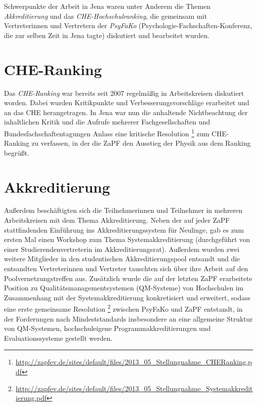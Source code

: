 \documentclass{scrartcl}
\renewcommand{\headrulewidth}{0pt}
\begin{document}
Schwerpunkte der Arbeit in Jena waren unter Anderem die Themen \emph{Akkreditierung} und das \emph{CHE-Hochschulranking}, die gemeinsam mit Vertreterinnen und Vertretern der \emph{PsyFaKo} (Psychologie-Fachschaften-Konferenz, die zur selben Zeit in Jena tagte) diskutiert und bearbeitet wurden.

\pagebreak
\renewcommand{\headrulewidth}{0.1pt}
\rhead{\thepage}

\section*{CHE-Ranking}
Das \emph{CHE-Ranking} war bereits seit 2007 regelmäßig in Arbeitskreisen diskutiert worden. Dabei wurden Kritikpunkte und Verbesserungsvorschläge erarbeitet und an das CHE herangetragen. In Jena war nun die anhaltende Nichtbeachtung der inhaltlichen Kritik und die Aufrufe mehrerer Fachgesellschaften und Bundesfachschaftentagungen Anlass eine kritische Resolution \footnote{\href{http://zapfev.de/sites/default/files/2013_05_Stellungnahme_CHERanking.pdf}{\url{http://zapfev.de/sites/default/files/2013_05_Stellungnahme_CHERanking.pdf}}} zum CHE-Ranking zu verfassen, in der die ZaPF den Ausstieg der Physik aus dem Ranking begrüßt.

\section*{Akkreditierung}
Außerdem beschäftigten sich die Teilnehmerinnen und Teilnehmer in mehreren Arbeitskreisen mit dem Thema Akkreditierung. Neben der auf jeder ZaPF stattfindenden Einführung ins Akkreditierungssystem für Neulinge, gab es zum ersten Mal einen Workshop zum Thema Systemakkreditierung (durchgeführt von einer Studierendenvertreterin im Akkreditierungsrat). Außerdem wurden zwei weitere Mitglieder in den studentischen Akkreditierungspool entsandt und die entsandten Vertreterinnen und Vertreter tauschten sich über ihre Arbeit auf den Poolvernetzungstreffen aus. Zusätzlich wurde die auf der letzten ZaPF erarbeitete Position zu Qualitätsmanagementsystemen (QM-Systeme) von Hochschulen im Zusammenhang mit der Systemakkreditierung konkretisiert und erweitert, sodass eine erste gemeinsame Resolution \footnote{\href{http://zapfev.de/sites/default/files/2013_05_Stellungnahme_Systemakkreditierung.pdf}{\url{http://zapfev.de/sites/default/files/2013_05_Stellungnahme_Systemakkreditierung.pdf}}} zwischen PsyFaKo und ZaPF entstandt, in der Forderungen nach Mindeststandards insbesondere an eine allgemeine Struktur von QM-Systemen, hochschuleigene Programmakkreditierungen und Evaluationssysteme gestellt werden.
\end{document}
